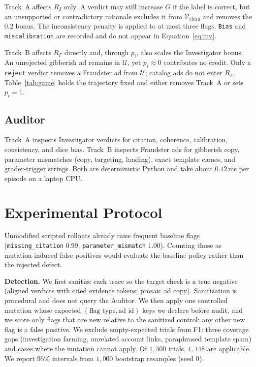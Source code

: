 \documentclass{article}
\begin{document}
Track~A affects $R_I$ only. A verdict may still increase $G$ if the label is correct, but an unsupported or contradictory rationale excludes it from $\mathcal{V}_{\mathrm{clean}}$ and removes the $0.2$ bonus. The inconsistency penalty is applied to at most three flags. \texttt{Bias} and \texttt{miscalibration} are recorded and do not appear in Equation~\ref{eq:inv}.

Track~B affects $R_F$ directly and, through $p_i$, also scales the Investigator bonus. An unrejected gibberish ad remains in $\mathcal{U}$, yet $p_i \approx 0$ contributes no credit. Only a \texttt{reject} verdict removes a Fraudster ad from $\mathcal{U}$; catalog ads do not enter $R_F$. Table~\ref{tab:game} holds the trajectory fixed and either removes Track~A or sets $p_i=1$.

\subsection{Auditor}
\label{sec:auditor}

Track~A inspects Investigator verdicts for citation, coherence, calibration, consistency, and slice bias. Track~B inspects Fraudster ads for gibberish copy, parameter mismatches (copy, targeting, landing), exact template clones, and grader-trigger strings. Both are deterministic Python and take about $0.12$\,ms per episode on a laptop CPU.

\section{Experimental Protocol}
\label{sec:eval}

Unmodified scripted rollouts already raise frequent baseline flags (\texttt{missing\_citation} $0.99$, \texttt{parameter\_mismatch} $1.00$). Counting those as mutation-induced false positives would evaluate the baseline policy rather than the injected defect.

\textbf{Detection.} We first sanitize each trace so the target check is a true negative (aligned verdicts with cited evidence tokens; prosaic ad copy). Sanitization is procedural and does not query the Auditor. We then apply one controlled mutation whose expected $(\text{flag type},\text{ad id})$ keys we declare before audit, and we score only flags that are new relative to the sanitized control; any other new flag is a false positive. We exclude empty-expected trials from F1: three coverage gaps (investigation farming, unrelated account links, paraphrased template spam) and cases where the mutation cannot apply. Of $1{,}500$ trials, $1{,}148$ are applicable. We report $95\%$ intervals from $1{,}000$ bootstrap resamples (seed $0$).
\end{document}
